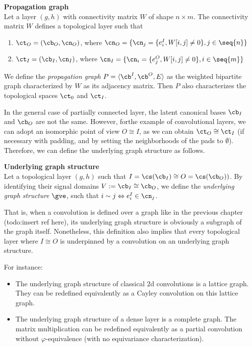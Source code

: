 \begin{lemma}\textbf{Propagation graph}\\
Let a layer $(g,h)$ with connectivity matrix $W$ of shape $n \times m$. The connectivity matrix $W$ defines a topological layer such that
\begin{enumerate}
  \item $\ct_O = (\cb_O, \cn_O)$, where $\cn_O = \{ \cn_j = \{ e^I_i, W[i,j] \neq 0 \}, j \in \seq{n}\}$
  \item $\ct_I = (\cb_I, \cn_I)$, where $\cn_I = \{ \cn_i = \{ e^O_j, W[i,j] \neq 0 \}, i \in \seq{m}\}$
\end{enumerate}
We define the \emph{propagation graph} $P = \langle \cb^I, \cb^O, E \rangle$ as the weighted bipartite graph characterized by $W$ as its adjacency matrix. Then $P$ also characterizes the topological spaces $\ct_0$ and $\ct_I$.
\end{lemma}

In the general case of partially connected layer, the latent canonical bases $\cb_I$ and $\cb_O$ are not the same. However, forthe example of convolutional layers, we can adopt an isomorphic point of view $O \cong I$, as we can obtain $\ct_O \cong \ct_I$ (if necessary with padding, and by setting the neighborhoods of the pads to $\emptyset$). Therefore, we can define the underlying graph structure as follows.

\begin{definition}\textbf{Underlying graph structure}\\
Let a topological layer $(g,h)$ such that $I = \cs(\cb_I) \cong O = \cs(\cb_O))$. By identifying their signal domains $V := \cb_I \cong \cb_O$, we define the \emph{underlying graph structure} $\gve$, such that $i \sim j \Leftrightarrow e^I_i \in \cn_j$.
\end{definition}

That is, when a convolution is defined over a graph like in the previous chapter (todo:insert ref here), its underlying graph structure is obviously a subgraph of the graph itself. Nonetheless, this definition also implies that every topological layer where $I \cong O$ is underpinned by a convolution on an underlying graph structure.

For instance:
\begin{itemize}
  \item The underlying graph structure of classical $2$d convolutions is a lattice graph. They can be redefined equivalently as a Cayley convolution on this lattice graph.
  \item The underlying graph structure of a dense layer is a complete graph. The matrix multiplication can be redefined equivalently as a partial convolution without $\varphi$-equivalence (\ie with no equivariance characterization).
\end{itemize}


